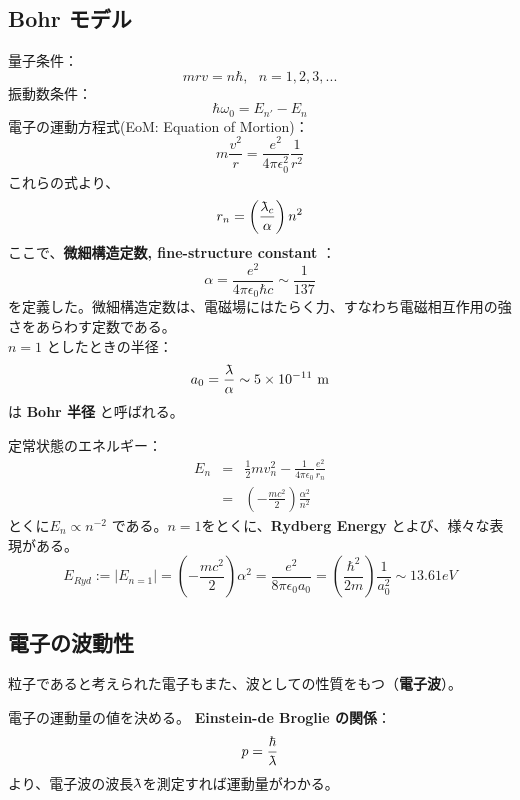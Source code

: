 \documentclass[a4j,10pt,oneside,openany]{jsbook}
\newcommand{\lambdabar}{{\mkern0.75mu\mathchar '26\mkern -9.75mu\lambda}}
\begin{document}
\subsection{Bohr モデル}
量子条件：
\[
	mrv = n\hbar,\ \ \ n = 1,2,3,...
\]
振動数条件：
\[
	\hbar \omega_0 = E_{n'} - E_n
\]
電子の運動方程式(EoM: Equation of Mortion)：
\[
	m \frac{v^2}{r} = \frac{e^2}{4\pi \epsilon_0^2} \frac{1}{r^2}
\]
これらの式より、
\[
	r_n = \left( \frac{\lambdabar_c}{\alpha} \right) n^2
\]
ここで、\textbf{微細構造定数, fine-structure constant} ：
\[
	\alpha = \frac{e^2}{4\pi\epsilon_0 \hbar c} \sim \frac{1}{137}
\]
を定義した。微細構造定数は、電磁場にはたらく力、すなわち電磁相互作用の強さをあらわす定数である。\\
$n=1$ としたときの半径：
\[
	a_0 = \frac{\lambdabar}{\alpha} \sim 5 \times 10^{-11}\ \mathrm{m}
\]
は \textbf{Bohr 半径} と呼ばれる。

定常状態のエネルギー：
\begin{eqnarray*}
	E_n &=& \frac{1}{2}mv_n^2 - \frac{1}{4\pi\epsilon_0} \frac{e^2}{r_n} \\
	&=& \left( -\frac{mc^2}{2} \right) \frac{\alpha^2}{n^2}
\end{eqnarray*}
とくに$E_n \propto n^{-2}$ である。$n=1$をとくに、\textbf{Rydberg Energy} とよび、様々な表現がある。
\[
	E_{Ryd} := |E_{n=1}| = \left( -\frac{mc^2}{2} \right) \alpha^2
	= \frac{e^2}{8\pi\epsilon_0 a_0}
	= \left( \frac{\hbar^2}{2m} \right) \frac{1}{a_0^2}
	\sim 13.61 eV
\]

\subsection{電子の波動性}
粒子であると考えられた電子もまた、波としての性質をもつ（\textbf{電子波}）。

電子の運動量の値を決める。 \textbf{Einstein-de Broglie の関係}：
\[
	p = \frac{\hbar}{\lambdabar}
\]
より、電子波の波長$\lambdabar$を測定すれば運動量がわかる。
\\
\end{document}
